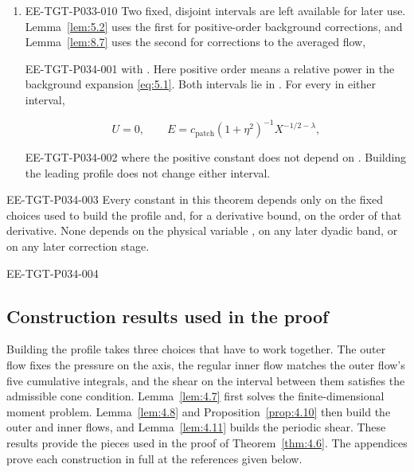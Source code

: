 \begin{theorem}
\begin{enumerate}[label=(\roman*)]
\item
\begin{EESegment}{EE-TGT-P033-010}
Two fixed, disjoint intervals
are left available for later use. Lemma~\ref{lem:5.2} uses the first for
positive-order background corrections, and Lemma~\ref{lem:8.7} uses the
second for corrections to the averaged flow,
\end{EESegment}
%
\begin{EESegment}{EE-TGT-P034-001}
with .
Here positive order means a relative power
 in the background expansion
\eqref{eq:5.1}. Both intervals lie in
. For every  in either
interval,
\end{EESegment}
\begin{equation}
  U=0,\qquad E=c_{\mathrm{patch}}(1+\eta^2)^{-1}X^{-1/2-\lambda},
  \tag{4.30}\label{eq:4.30}
\end{equation}
\begin{EESegment}{EE-TGT-P034-002}
where the positive constant  does not
depend on . Building the leading profile does not
change either interval.
\end{EESegment}
\end{enumerate}

\begin{EESegment}{EE-TGT-P034-003}
Every constant in this theorem depends only on the fixed choices used to
build the profile and, for a derivative bound, on the order of that
derivative. None depends on the physical variable
, on any later dyadic band, or on any later correction
stage.
\end{EESegment}
\end{theorem}

\begin{EESegment}{EE-TGT-P034-004}
\subsection{Construction results used in the proof}\label{sec:4.5}

Building the profile takes three choices that have to work together. The
outer flow fixes the pressure on the axis, the regular inner flow matches the outer flow's
five cumulative integrals, and the shear on the interval between them
satisfies the admissible cone condition. Lemma~\ref{lem:4.7} first solves the
finite-dimensional moment problem. Lemma~\ref{lem:4.8} and
Proposition~\ref{prop:4.10} then build the outer and inner flows, and
Lemma~\ref{lem:4.11} builds the periodic shear. These results provide the
pieces used in the proof of Theorem~\ref{thm:4.6}. The appendices prove each
construction in full at the references given below.
\end{EESegment}

